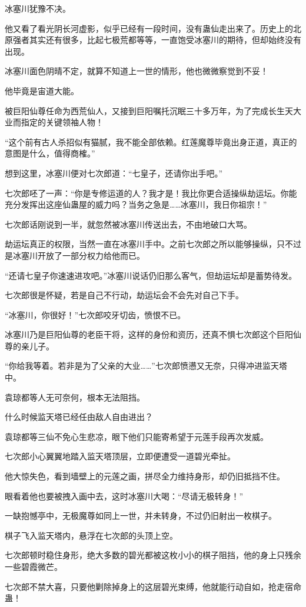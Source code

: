 \begin{this_body}
冰塞川犹豫不决。

他又看了看光阴长河虚影，似乎已经有一段时间，没有蛊仙走出来了。历史上的北原强者其实还有很多，比起七极荒都等等，一直饱受冰塞川的期待，但却始终没有出现。

冰塞川面色阴晴不定，就算不知道上一世的情形，他也微微察觉到不妥！

他毕竟是宙道大能。

被巨阳仙尊任命为西荒仙人，又接到巨阳嘱托沉眠三十多万年，为了完成长生天大业而指定的关键领袖人物！

“这个前有古人杀招似有猫腻，我不能全部依赖。红莲魔尊毕竟出身正道，真正的意图是什么，值得商榷。”

想到这里，冰塞川便对七次郎道：“七皇子，还请你出手吧。”

七次郎呸了一声：“你是专修运道的人？我才是！我比你更合适操纵劫运坛。你能充分发挥出这座仙蛊屋的威力吗？当务之急是……冰塞川，我日你祖宗！”

七次郎话刚说到一半，就忽然被冰塞川传送出去，不由地破口大骂。

劫运坛真正的权限，当然一直在冰塞川手中。之前七次郎之所以能够操纵，只不过是冰塞川开放了一部分权力给他而已。

“还请七皇子你速速进攻吧。”冰塞川说话仍旧那么客气，但劫运坛却是蓄势待发。

七次郎很是怀疑，若是自己不行动，劫运坛会不会先对自己下手。

“冰塞川，你很好！”七次郎咬牙切齿，愤恨不已。

冰塞川乃是巨阳仙尊的老臣干将，这样的身份和资历，还真不惧七次郎这个巨阳仙尊的亲儿子。

“你给我等着。若非是为了父亲的大业……”七次郎愤懑又无奈，只得冲进监天塔中。

袁琼都等人无可奈何，根本无法阻挡。

什么时候监天塔已经任由敌人自由进出？

袁琼都等三仙不免心生悲凉，眼下他们只能寄希望于元莲手段再次发威。

七次郎小心翼翼地踏入监天塔顶层，立即便遭受一道碧光牵扯。

他大惊失色，看到墙壁上的元莲之画，拼尽全力维持身形，却仍旧抵挡不住。

眼看着他也要被拽入画中去，这时冰塞川大喝：“尽请无极转身！”

一缺抱憾亭中，无极魔尊如同上一世，并未转身，不过仍旧射出一枚棋子。

棋子飞入监天塔内，悬浮在七次郎的头顶上空。

七次郎顿时稳住身形，绝大多数的碧光都被这枚小小的棋子阻挡，他的身上只残余一些碧霞微芒。

七次郎不禁大喜，只要他剿除掉身上的这层碧光束缚，他就能行动自如，抢走宿命蛊！

\end{this_body}

